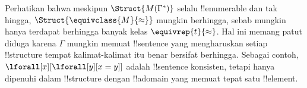 \documentclass[../../../include/open-logic-section]{subfiles}
\begin{document}
\begin{digress}
Perhatikan bahwa meskipun $\Struct{M(\Gamma^*)}$ selalu !!{enumerable}
dan tak hingga, $\Struct{\equivclass{M}{\approx}}$ mungkin berhingga,
sebab mungkin hanya terdapat berhingga banyak kelas
$\equivrep{t}{\approx}$. Hal ini memang patut diduga karena $\Gamma$
mungkin memuat !!{sentence} yang mengharuskan setiap !!{structure} tempat
kalimat-kalimat itu benar bersifat berhingga. Sebagai contoh,
$\lforall[x][\lforall[y][x = y]]$ adalah !!{sentence} konsisten, tetapi
hanya dipenuhi dalam !!{structure} dengan !!a{domain} yang memuat tepat
satu !!{element}.
\end{digress}
\end{document}
